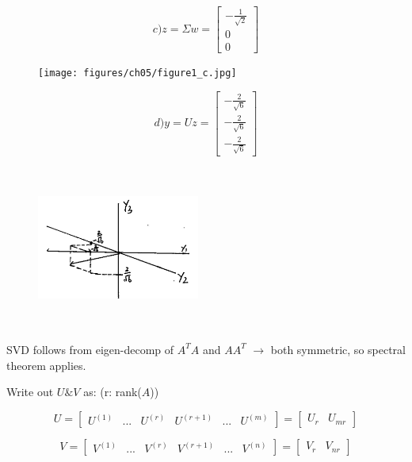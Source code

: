 \begin{example}
\begin{figure}
	\end{figure}
	$$ c) z = \Sigma w = 
	\left[
	\begin{matrix}
	-\frac{1}{\sqrt{2}}\\
	0\\
	0
	\end{matrix}
	\right]
	$$
	\begin{figure}
		\centering
		\texttt{[image: figures/ch05/figure1\_c.jpg]}
	\end{figure}
	$$ d) y = Uz =  
	\left[
	\begin{matrix}
	-\frac{2}{\sqrt{6}}\\
	-\frac{2}{\sqrt{6}}\\
	-\frac{2}{\sqrt{6}}
	\end{matrix}
	\right]
	$$
	\begin{figure}
		\centering
		\includegraphics[width=2.1in,height=2.1in]{figures/ch05/figure1_d.jpg}
	\end{figure}
	
	
\end{example}


SVD follows from eigen-decomp of $A^TA$ and $AA^T$ $\rightarrow$ both symmetric, so spectral theorem applies. 

Write out $U\& V$ as: (r: rank($A$))



$$ U =   
\left[
\begin{matrix}
U^{(1)} & ... & U^{(r)} & U^{(r+1)} & ... & U^{(m)}
\end{matrix}
\right] =
\left[
\begin{matrix}
U_r & U_{mr}
\end{matrix}
\right]
$$


$$ V =   
\left[
\begin{matrix}
V^{(1)} & ... & V^{(r)} & V^{(r+1)} & ... & V^{(n)}
\end{matrix}
\right] =
\left[
\begin{matrix}
V_r & V_{nr}
\end{matrix}
\right]
$$




